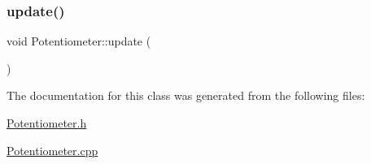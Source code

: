\subsubsection{\texorpdfstring{update()}{update()}}
{\footnotesize\ttfamily void Potentiometer\+::update (\begin{DoxyParamCaption}{ }\end{DoxyParamCaption})}



The documentation for this class was generated from the following files\+:\begin{DoxyCompactItemize}
\item 
\mbox{\hyperlink{_potentiometer_8h}{Potentiometer.\+h}}\item 
\mbox{\hyperlink{_potentiometer_8cpp}{Potentiometer.\+cpp}}\end{DoxyCompactItemize}

